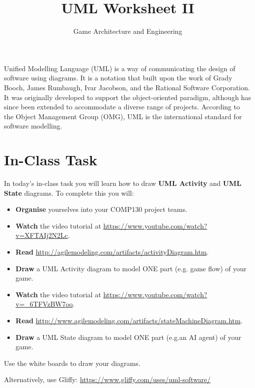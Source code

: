 \documentclass{scrartcl}
\begin{document}
\title{UML Worksheet II}
\author{Game Architecture and Engineering}
\date{}

\maketitle

Unified Modelling Language (UML) is a way of communicating the design of software using diagrams. It is a notation that built upon the work of Grady Booch, James Rumbaugh, Ivar Jacobson, and the Rational Software Corporation. It was originally developed to support the object-oriented paradigm, although has since been extended to accommodate a diverse range of projects. According to the Object Management Group (OMG), UML is the international standard for software modelling.

\section{In-Class Task}

In today's in-class task you will learn how to draw \textbf{UML Activity} and \textbf{UML State} diagrams. To complete this you will:

\begin{itemize}
	\item \textbf{Organise} yourselves into your COMP130 project teams.
	\item \textbf{Watch} the video tutorial at \url{https://www.youtube.com/watch?v=XFTAIj2N2Lc}.
	\item \textbf{Read} \url{http://agilemodeling.com/artifacts/activityDiagram.htm}.
	\item \textbf{Draw} a UML Activity diagram to model ONE part (e.g. game flow) of your game.
	\item \textbf{Watch} the video tutorial at \url{https://www.youtube.com/watch?v=_6TFVzBW7oo}.
	\item \textbf{Read} \url{http://www.agilemodeling.com/artifacts/stateMachineDiagram.htm}.
	\item \textbf{Draw} a UML State diagram to model ONE part (e.g.an AI agent) of your game.
\end{itemize}

\vspace{1ex}

Use the white boards to draw your diagrams.
 
Alternatively, use Gliffy: \url{https://www.gliffy.com/uses/uml-software/}
\end{document}

